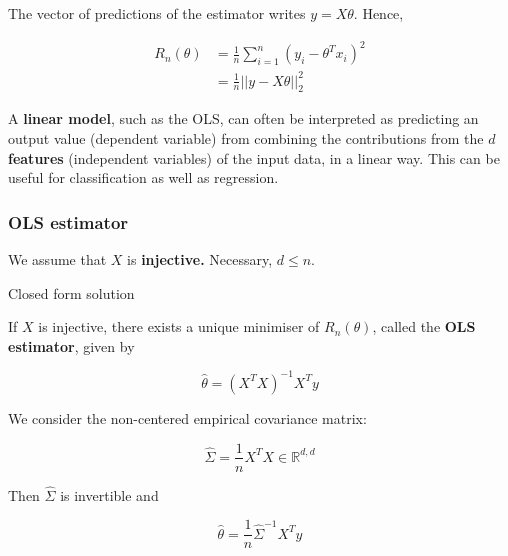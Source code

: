\documentclass[
10pt, %
a4paper, %
oneside, %
headinclude,footinclude, %
BCOR5mm, %
]{scrartcl}
\begin{document}
The vector of predictions of the estimator writes $y = X\theta$.  Hence,

\begin{equation*}
    \begin{aligned}
	R_n(\theta) &= \frac{1}{n} \sum^{n}_{i=1} (y_i-\theta^Tx_i)^2\\
	&= \frac{1}{n} ||y-X\theta||_2^2
    \end{aligned}
\end{equation*}

\begin{remark}
    A \textbf{{linear model}}, such as the OLS, can often be interpreted as
    predicting an output value (dependent variable) from combining the contributions from the $d$
    \textbf{{features}} (independent variables) of the input data, in a linear
    way. This can be useful for classification as well as regression.
\end{remark}

\subsubsection{\large\color{Periwinkle}OLS estimator}

We assume that $X$ is \textbf{{injective.}}  Necessary, $d\leq n$.

\begin{proposition}{Closed form solution}
    
    If $X$ is injective, there exists a unique minimiser of $R_n(\theta)$, called the \textbf{{OLS estimator}}, given by

    \begin{equation}
	\label{def:ols}
	\hat{ \theta}= (X^TX)^{-1}X^Ty
    \end{equation}
\end{proposition}

\begin{remark}

    We consider the non-centered empirical covariance matrix:

    \begin{equation}
	\label{eq:Sigma}
	\hat{\Sigma} = \frac{1}{n} X^TX\in \mathbb{R}^{d, d}
    \end{equation}

    Then $ \hat{\Sigma}$ is invertible and

    \begin{equation}
	\hat{\theta} = \frac{1}{n} \hat{\Sigma}^{-1} X^Ty
    \end{equation}
    
\end{remark}
\end{document}
